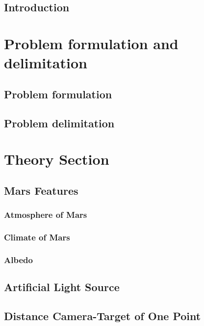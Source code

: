 \documentclass[12pt,a4paper,fleqn, onesside]{report}
\begin{document}
\pagebreak
{}
\setcounter{page}{1}
\setcounter{tocdepth}{4}
\setcounter{secnumdepth}{4} 
\def\chaptername{Part}

\tableofcontents
\newpage
{}

\section*{Introduction}


\chapter{Problem formulation and delimitation}
\section{Problem formulation}


\section{Problem delimitation}


\chapter{Theory Section}
\section{Mars Features}

\subsection{Atmosphere of Mars}

\subsection{Climate of Mars}

\subsection{Albedo}

\section{Artificial Light Source}

\section{Distance Camera-Target of One Point}

\end{document}
